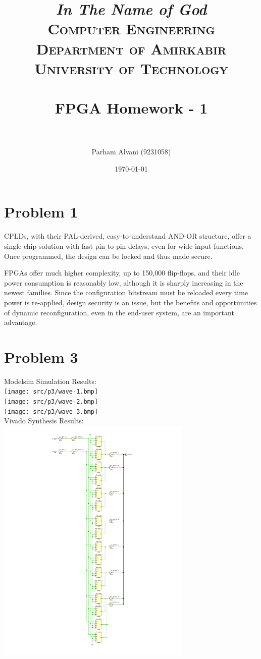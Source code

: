 \documentclass[paper=a4, fontsize=11pt]{scrartcl} %
\title{	
\normalfont \normalsize
\textit{In The Name of God} \\
\textsc{Computer Engineering Department of Amirkabir University of Technology} \\ [25pt]
\horrule{0.5pt} \\[0.4cm] %
\huge FPGA Homework - 1 \\ %
\horrule{2pt} \\[0.5cm] %
}
\author{Parham Alvani (9231058)}
\date{\normalsize\today}
\numberwithin{equation}{section} %
\numberwithin{figure}{section} %
\numberwithin{table}{section} %
\begin{document}
\maketitle


\section{Problem 1}
\par CPLDs, with their PAL-derived, easy-to-understand AND-OR structure,
offer a single-chip solution with fast pin-to-pin delays,
even for wide input functions.
Once programmed, the design can be locked and thus made secure.
\par FPGAs offer much higher complexity, up to 150,000 flip-flops, and their idle power consumption is reasonably low,
although it is sharply increasing in the newest families.
Since the configuration bitstream must be reloaded every time power is re-applied,
design security is an issue, but the benefits and opportunities of dynamic reconfiguration,
even in the end-user system, are an important advantage.


\section{Problem 3}
Modelsim Simulation Results:\\

\texttt{[image: src/p3/wave-1.bmp]}\\
\texttt{[image: src/p3/wave-2.bmp]}\\
\texttt{[image: src/p3/wave-3.bmp]}\\

Vivado Synthesis Results:\\

\includegraphics[height=12cm]{src/p3/schematic.png}\\
\end{document}
